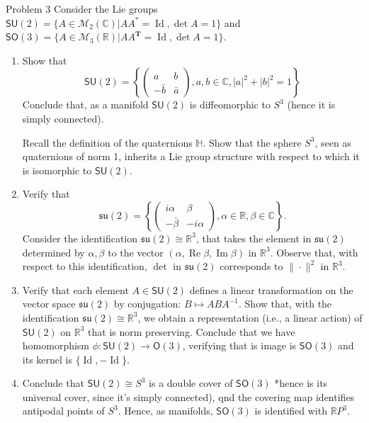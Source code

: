 \begin{thing1}{Problem 3}\leavevmode
	Consider the Lie groups $\mathsf{SU}(2) =\{A\in\mathcal{M}_{2}(\mathbb{C})|AA^*=\operatorname{Id}, \det A=1\}$ and $\mathsf{SO}(3) =\{A\in\mathcal{M}_{3}(\mathbb{R})|AA^{\mathbf{T}}=\operatorname{Id},\det A=1\}$.
	\begin{enumerate}[label=\alph*.]
		\item Show that
		\[\mathsf{SU}(2) =\left\{ \begin{pmatrix} a&b\\-\bar{b}&\bar{a} \end{pmatrix} ,a,b\in\mathbb{C},|a|^2+|b|^2=1\right\} \]
		Conclude that, as a manifold $\mathsf{SU}(2)$ is diffeomorphic to $S^3$ (hence it is simply connected).

		Recall the definition of the quaternions $\mathbb{H}$. Show that the sphere $S^3$, seen as quaternions of norm 1, inherits a Lie group structure with respect to which it is isomorphic to $\mathsf{SU}(2)$.

	\item Verify that
		\begin{equation}\label{eq:1}
			\mathfrak{su}(2) =\left\{ \begin{pmatrix} i\alpha &\beta\\-\bar{\beta} &-i\alpha \end{pmatrix} ,\alpha\in\mathbb{R},\beta\in\mathbb{C} \right\} .
		\end{equation}
		Consider the identification $\mathfrak{su}(2) \cong \mathbb{R}^{3}$, that takes the element in $\mathfrak{su}(2)$ determined by $\alpha,\beta$ to the vector $(\alpha,\operatorname{Re}\beta,\operatorname{Im}\beta)$ in $\mathbb{R}^{3}$. Observe that, with respect to this identification, $ \det $ in $\mathfrak{su}(2)$ corresponds to $\|\cdot\|^2$ in $\mathbb{R}^{3}$.


	\item Verify that each element $A\in\mathsf{SU}(2)$ defines a linear transformation on the vector space $\mathfrak{su}(2)$ by conjugation: $B\mapsto ABA^{-1}$. Show that, with the identification $\mathfrak{su}(2) \cong \mathbb{R}^{3}$, we obtain a representation (i.e., a linear action) of $\mathsf{SU}(2)$ on $\mathbb{R}^{3}$ that is norm preserving. Conclude that we have homomorphism $\phi:\mathsf{SU}(2) \to \mathsf{O}(3)$, verifying that is image is $\mathsf{SO}(3)$ and its kernel is $\{\operatorname{Id},-\operatorname{Id}\}$.

	\item Conclude that $\mathsf{SU}(2) \cong S^3$ is a double cover of $\mathsf{SO}(3)$ *hence is its universal cover, since it's simply connected), qnd the covering map identifies antipodal points of $S^3$. Hence, as manifolds, $\mathsf{SO}(3)$ is identified with $\mathbb{R}P^{3}$.
	\end{enumerate}
\end{thing1}

